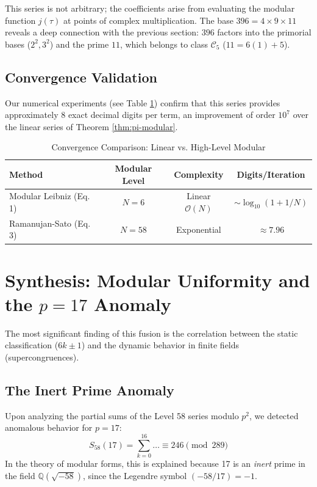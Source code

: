 \documentclass[12pt, a4paper]{article}
\theoremstyle{plain}
\theoremstyle{definition}
\theoremstyle{remark}
\numberwithin{equation}{section}
\begin{document}
This series is not arbitrary; the coefficients arise from evaluating the modular function $j(\tau)$ at points of complex multiplication. The base $396 = 4 \times 9 \times 11$ reveals a deep connection with the previous section: $396$ factors into the primorial bases ($2^2, 3^2$) and the prime $11$, which belongs to class $\mathcal{C}_5$ ($11 = 6(1)+5$).

\subsection{Convergence Validation}
Our numerical experiments (see Table \ref{tab:conv}) confirm that this series provides approximately 8 exact decimal digits per term, an improvement of order $10^7$ over the linear series of Theorem \ref{thm:pi-modular}.

\begin{table}[h]
\centering
\caption{Convergence Comparison: Linear vs. High-Level Modular}
\label{tab:conv}
\begin{tabular}{@{}lccc@{}}
\toprule
\textbf{Method} & \textbf{Modular Level} & \textbf{Complexity} & \textbf{Digits/Iteration} \\ \midrule
Modular Leibniz (Eq. 1) & $N=6$ & Linear $\mathcal{O}(N)$ & $\sim \log_{10}(1 + 1/N)$ \\
Ramanujan-Sato (Eq. 3) & $N=58$ & Exponential & $\approx 7.96$ \\ \bottomrule
\end{tabular}
\end{table}

\section{Synthesis: Modular Uniformity and the $p=17$ Anomaly}

The most significant finding of this fusion is the correlation between the static classification ($6k \pm 1$) and the dynamic behavior in finite fields (supercongruences).

\subsection{The Inert Prime Anomaly}
Upon analyzing the partial sums of the Level 58 series modulo $p^2$, we detected anomalous behavior for $p=17$:
\begin{equation}
S_{58}(17) = \sum_{k=0}^{16} \dots \equiv 246 \pmod{289}
\end{equation}
In the theory of modular forms, this is explained because 17 is an \textit{inert} prime in the field $\mathbb{Q}(\sqrt{-58})$, since the Legendre symbol $(-58/17) = -1$.
\end{document}
